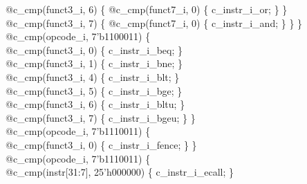 {\indent \hspace{\parindent} \hspace{\parindent} @c\_cmp(funct3\_i, 6) \{ @c\_cmp(funct7\_i, 0)  \{ c\_instr\_i\_or; \} \}\\%
\indent \hspace{\parindent}	\hspace{\parindent} @c\_cmp(funct3\_i, 7) \{ @c\_cmp(funct7\_i, 0)  \{ c\_instr\_i\_and; \} \} \}\\%
\indent \hspace{\parindent} @c\_cmp(opcode\_i, 7'b1100011) \{\\%
\indent \hspace{\parindent} \hspace{\parindent} @c\_cmp(funct3\_i, 0) \{ c\_instr\_i\_beq; \}\\%
\indent \hspace{\parindent} \hspace{\parindent} @c\_cmp(funct3\_i, 1) \{ c\_instr\_i\_bne; \}\\%
\indent \hspace{\parindent} \hspace{\parindent} @c\_cmp(funct3\_i, 4) \{ c\_instr\_i\_blt; \}\\%
\indent \hspace{\parindent} \hspace{\parindent} @c\_cmp(funct3\_i, 5) \{ c\_instr\_i\_bge; \}\\%
\indent \hspace{\parindent} \hspace{\parindent} @c\_cmp(funct3\_i, 6) \{ c\_instr\_i\_bltu; \}\\%
\indent \hspace{\parindent} \hspace{\parindent} @c\_cmp(funct3\_i, 7) \{ c\_instr\_i\_bgeu; \} \} \\%
\indent \hspace{\parindent} @c\_cmp(opcode\_i, 7'b1110011) \{\\%
\indent \hspace{\parindent} \hspace{\parindent} @c\_cmp(funct3\_i, 0) \{ c\_instr\_i\_fence; \} \}\\%
\indent \hspace{\parindent} @c\_cmp(opcode\_i, 7'b1110011) \{\\%
\indent \hspace{\parindent} \hspace{\parindent} @c\_cmp(instr[31:7], 25'h000000) \{ c\_instr\_i\_ecall; \}\\%
}
